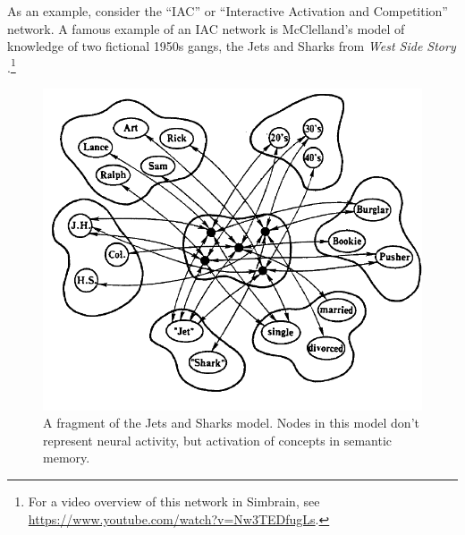 As an example, consider the ``IAC'' or ``Interactive Activation and Competition'' network. A famous example of an IAC network is McClelland's model of knowledge of two fictional 1950s gangs, the Jets and Sharks from {\em West Side Story} \cite{mcclelland1981retrieving}.\footnote{For a video overview of this network in Simbrain, see \url{https://www.youtube.com/watch?v=Nw3TEDfugLs}.}

\begin{figure}[h]
\centering
\includegraphics[scale=.3]{./images/IAC_JetsSharks.png}
\caption[From McClelland and Rumelhart, 1989 \cite{mcclelland1989explorations}.]{A fragment of the Jets and Sharks model. Nodes in this model don't represent neural activity, but activation of concepts in semantic memory.}
\label{iac}
\end{figure}


